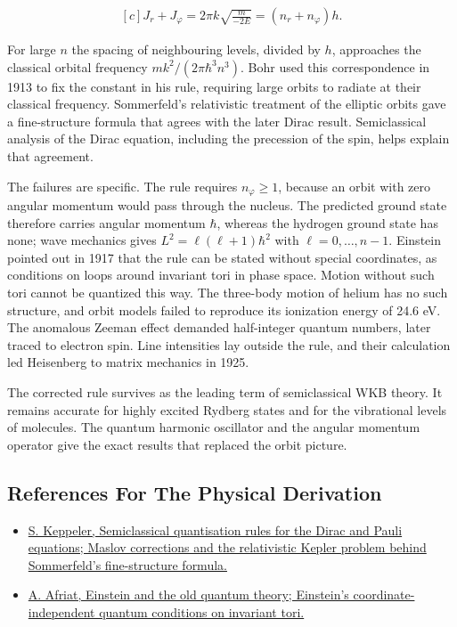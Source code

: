 \documentclass[11pt,oneside]{book}
\newenvironment{centeredalign}{\[\begin{gathered}[c]}{\end{gathered}\]}
\begin{document}
\begin{centeredalign}
J_r+J_\varphi=2\pi k\sqrt{\frac{m}{-2E}}=(n_r+n_\varphi)h.
\end{centeredalign}

For large \(n\) the spacing of neighbouring levels, divided by \(h\), approaches the classical orbital frequency \(mk^2/(2\pi\hbar^3n^3)\). Bohr used this correspondence in 1913 to fix the constant in his rule, requiring large orbits to radiate at their classical frequency. Sommerfeld's relativistic treatment of the elliptic orbits gave a fine-structure formula that agrees with the later Dirac result. Semiclassical analysis of the Dirac equation, including the precession of the spin, helps explain that agreement.

The failures are specific. The rule requires \(n_\varphi\geq1\), because an orbit with zero angular momentum would pass through the nucleus. The predicted ground state therefore carries angular momentum \(\hbar\), whereas the hydrogen ground state has none; wave mechanics gives \(L^2=\ell(\ell+1)\hbar^2\) with \(\ell=0,\ldots,n-1\). Einstein pointed out in 1917 that the rule can be stated without special coordinates, as conditions on loops around invariant tori in phase space. Motion without such tori cannot be quantized this way. The three-body motion of helium has no such structure, and orbit models failed to reproduce its ionization energy of 24.6 eV. The anomalous Zeeman effect demanded half-integer quantum numbers, later traced to electron spin. Line intensities lay outside the rule, and their calculation led Heisenberg to matrix mechanics in 1925.

The corrected rule survives as the leading term of semiclassical WKB theory. It remains accurate for highly excited Rydberg states and for the vibrational levels of molecules. The quantum harmonic oscillator and the angular momentum operator give the exact results that replaced the orbit picture.

\subsection*{References For The Physical Derivation}
\begin{itemize}
\item \href{https://arxiv.org/abs/quant-ph/0212082}{S. Keppeler, Semiclassical quantisation rules for the Dirac and Pauli equations; Maslov corrections and the relativistic Kepler problem behind Sommerfeld's fine-structure formula.}
\item \href{https://arxiv.org/abs/2112.14194}{A. Afriat, Einstein and the old quantum theory; Einstein's coordinate-independent quantum conditions on invariant tori.}
\end{itemize}
\end{document}
